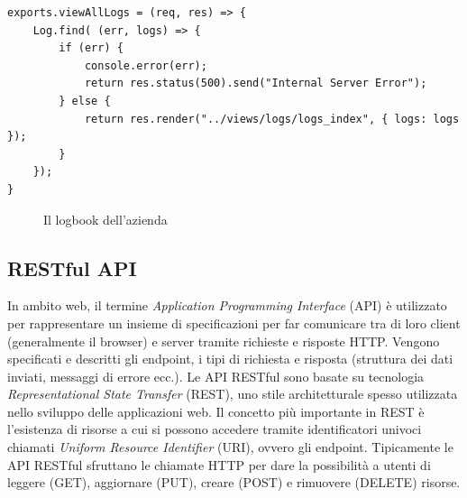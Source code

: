\documentclass[12pt]{report}
\begin{document}
\begin{lstlisting}[caption={Questa funzione viene eseguita quando un browser accede (richiesta GET) all'endpoint \emph{/api/logs/view}}, label={lst:viewLogs}]
exports.viewAllLogs = (req, res) => {
	Log.find( (err, logs) => {
		if (err) {
			console.error(err);
			return res.status(500).send("Internal Server Error");
		} else {
			return res.render("../views/logs/logs_index", { logs: logs });
		}
	});
}
\end{lstlisting}

\begin{figure}[H]
	\caption{Il logbook dell'azienda}
	\label{fig:logbook}
\end{figure}

\subsection{RESTful API}\label{sec:api}
%
In ambito web, il termine \emph{Application Programming Interface} (API) è utilizzato per rappresentare un insieme di specificazioni per far comunicare tra di loro client (generalmente il browser) e server tramite richieste e risposte HTTP. Vengono specificati e descritti gli endpoint, i tipi di richiesta e risposta (struttura dei dati inviati, messaggi di errore ecc.).
Le API RESTful sono basate su tecnologia \emph{Representational State Transfer} (REST), uno stile architetturale spesso utilizzata nello sviluppo delle applicazioni web. Il concetto più importante in REST è l'esistenza di risorse a cui si possono accedere tramite identificatori univoci chiamati \emph{Uniform Resource Identifier} (URI), ovvero gli endpoint.
Tipicamente le API RESTful sfruttano le chiamate HTTP per dare la possibilità a utenti di leggere (GET), aggiornare (PUT), creare (POST) e rimuovere (DELETE) risorse. 
\end{document}
